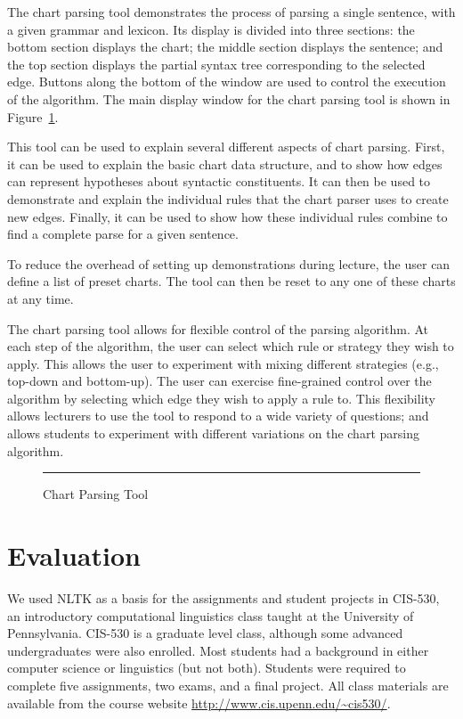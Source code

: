 \documentclass[11pt]{article}
\begin{document}
The chart parsing tool demonstrates the process of parsing a single
sentence, with a given grammar and lexicon.  Its display is divided
into three sections: the bottom section displays the chart; the middle
section displays the sentence; and the top section displays the
partial syntax tree corresponding to the selected edge.  Buttons along
the bottom of the window are used to control the execution of the
algorithm.  The main display window for the chart parsing tool is
shown in Figure~\ref{fig:chartparse}.   

This tool can be used to explain several different aspects of chart
parsing.  First, it can be used to explain the basic chart data
structure, and to show how edges can represent hypotheses about
syntactic constituents.  It can then be used to demonstrate and
explain the individual rules that the chart parser uses to create new
edges.  Finally, it can be used to show how these individual rules
combine to find a complete parse for a given sentence.

To reduce the overhead of setting up demonstrations during lecture,
the user can define a list of preset charts.  The tool can then be
reset to any one of these charts at any time.

The chart parsing tool allows for flexible control of the parsing
algorithm.  At each step of the algorithm, the user can select which
rule or strategy they wish to apply.  This allows the user to
experiment with mixing different strategies (e.g., top-down and
bottom-up).  The user can exercise fine-grained control over the
algorithm by selecting which edge they wish to apply a rule to.  This
flexibility allows lecturers to use the tool to respond to a wide
variety of questions; and allows students to experiment with different
variations on the chart parsing algorithm.

\begin{figure}
\centerline{}
\caption{Chart Parsing Tool}\label{fig:chartparse}
\vspace*{2ex}\hrule
\end{figure}

\section{Evaluation}
\label{sec:evaluation}

We used NLTK as a basis for the assignments and student projects in
CIS-530, an introductory computational linguistics class taught at the
University of Pennsylvania.  CIS-530 is a graduate level class,
although some advanced undergraduates were also enrolled.  Most
students had a background in either computer science or linguistics
(but not both).  Students were required to complete five assignments,
two exams, and a final project.  All class materials are available
from the course website \mbox{\url{http://www.cis.upenn.edu/~cis530/}}.
\end{document}

